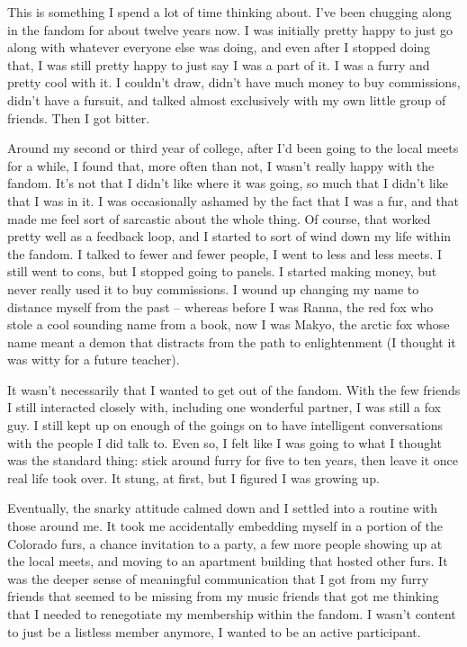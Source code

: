 This is something I spend a lot of time thinking about.  I've been chugging along in the fandom for about twelve years now.  I was initially pretty happy to just go along with whatever everyone else was doing, and even after I stopped doing that, I was still pretty happy to just say I was a part of it.  I was a furry and pretty cool with it.  I couldn't draw, didn't have much money to buy commissions, didn't have a fursuit, and talked almost exclusively with my own little group of friends.  Then I got bitter.

Around my second or third year of college, after I'd been going to the local meets for a while, I found that, more often than not, I wasn't really happy with the fandom.  It's not that I didn't like where it was going, so much that I didn't like that I was in it.  I was occasionally ashamed by the fact that I was a fur, and that made me feel sort of sarcastic about the whole thing.  Of course, that worked pretty well as a feedback loop, and I started to sort of wind down my life within the fandom.  I talked to fewer and fewer people, I went to less and less meets.  I still went to cons, but I stopped going to panels.  I started making money, but never really used it to buy commissions.  I wound up changing my name to distance myself from the past -- whereas before I was Ranna, the red fox who stole a cool sounding name from a book, now I was Makyo, the arctic fox whose name meant a demon that distracts from the path to enlightenment (I thought it was witty for a future teacher).

It wasn't necessarily that I wanted to get out of the fandom.  With the few friends I still interacted closely with, including one wonderful partner, I was still a fox guy.  I still kept up on enough of the goings on to have intelligent conversations with the people I did talk to.  Even so, I felt like I was going to what I thought was the standard thing: stick around furry for five to ten years, then leave it once real life took over.  It stung, at first, but I figured I was growing up.

Eventually, the snarky attitude calmed down and I settled into a routine with those around me.  It took me accidentally embedding myself in a portion of the Colorado furs, a chance invitation to a party, a few more people showing up at the local meets, and moving to an apartment building that hosted other furs.  It was the deeper sense of meaningful communication that I got from my furry friends that seemed to be missing from my music friends that got me thinking that I needed to renegotiate my membership within the fandom.  I wasn't content to just be a listless member anymore, I wanted to be an active participant.

